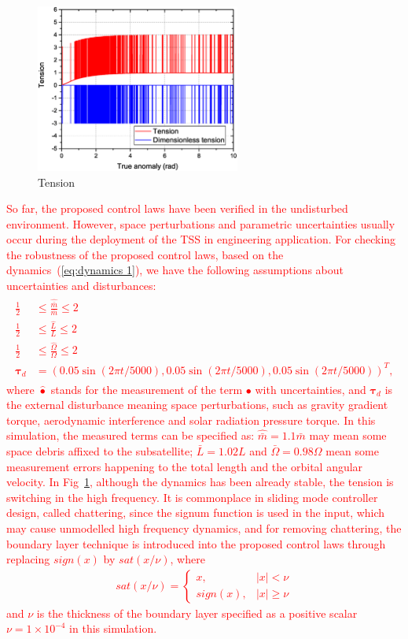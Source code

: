 \documentclass[3p]{elsarticle}
\theoremstyle{plain}
\theoremstyle{remark}
\begin{document}
\begin{figure}
\centering
\includegraphics[width=0.6\textwidth]{paper4_fig6.eps}
\caption{Tension}
\label{fig:6}
\end{figure}
\textcolor{red}{So far, the proposed control laws have been verified in the undisturbed environment. However, space perturbations and parametric uncertainties usually occur during the deployment of the TSS in engineering application. For checking the robustness of the proposed control laws, based on the dynamics~(\ref{eq:dynamics 1}), we have the following assumptions about uncertainties and disturbances:
\begin{align}\begin{split}
\frac{1}{2}&\le\frac{\hat{\bar m}}{\bar m}\le 2\\
\frac{1}{2}&\le\frac{\hat L}{L}\le 2\\
\frac{1}{2}&\le\frac{\hat \Omega}{\Omega}\le 2\\
\bm\tau_d&=\left(0.05\sin(2\pi t/5000),0.05\sin(2\pi t/5000),0.05\sin(2\pi t/5000)\right)^T,
\end{split}\end{align}
where $\hat\bullet$ stands for the measurement of the term $\bullet$ with uncertainties, and $\bm\tau_d$ is the external disturbance meaning  space perturbations, such as gravity gradient torque, aerodynamic interference and solar radiation pressure torque. In this simulation, the measured terms can be specified as: $\hat{\bar m}=1.1\bar m$ may mean some space debris affixed to the subsatellite; $\bar L=1.02L$ and $\bar \Omega=0.98\Omega$ mean some measurement errors happening to the total length and the orbital angular velocity. In Fig~\ref{fig:6}, although the dynamics has been already stable, the tension is switching in the high frequency. It is commonplace in sliding mode controller design, called chattering, since the signum function is used in the input, which may cause unmodelled high frequency dynamics, and for removing chattering, the boundary layer technique is introduced into the proposed control laws through replacing $sign(x)$ by $sat(x/\nu)$, where
\begin{align}
sat(x/\nu)=
\begin{cases}
x,&\vert x\vert <\nu\\
sign(x),&\vert x\vert\ge\nu
\end{cases}
\end{align}
and $\nu$ is the thickness of the boundary layer specified as a positive scalar $\nu=1\times 10^{-4}$ in this simulation.}\par
\end{document}
